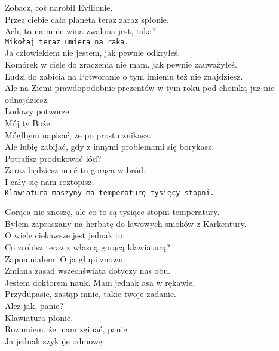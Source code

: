 \charmik{}
Zobacz, coś narobił Evilionie.\\
Przez ciebie cała planeta teraz zaraz spłonie.\\

\chardokt{}
Ach, to na mnie wina zwalona jest, taka?\\
\texttt{Mikołaj teraz umiera na raka.}\\

\charmik{}
Ja człowiekiem nie jestem, jak pewnie odkryłeś.\\
Komórek w ciele do zraczenia nie mam, jak pewnie zauważyłeś.\\
Ludzi do zabicia na Potworanie o tym imieniu też nie znajdziesz.\\
Ale na Ziemi prawdopodobnie prezentów w tym roku pod choinką już nie odnajdziesz.\\

\chardokt{}
Lodowy potworze. \\
Mój ty Boże. \\
Mógłbym napisać, że po prostu znikasz. \\
Ale lubię zabijać, gdy z innymi problemami się borykasz.\\
Potrafisz produkować lód?\\
Zaraz będziesz mieć tu gorąca w bród.\\
I cały się nam roztopisz.\\
\texttt{Klawiatura maszyny ma temperaturę tysięcy stopni.}\\


\charmik{}
Gorąca nie znoszę, ale co to są tysiące stopni temperatury.\\
Byłem zapraszany na herbatę do lawowych smoków z Karkentury.\\
O wiele ciekawsze jest jednak to.\\
Co zrobisz teraz z własną gorącą klawiaturą?\\

\chardokt{}
Zapomniałem. O ja głupi znowu.\\
Zmiana zasad wszechświata dotyczy nas obu.\\
Jestem doktorem nauk. Mam jednak asa w rękawie.\\
Przydupasie, zastąp mnie, takie twoje zadanie.\\

\charprzy{}
Ależ jak, panie?\\
Klawiatura płonie.\\
Rozumiem, że mam zginąć, panie.\\
Ja jednak szykuję odmowę.\\

